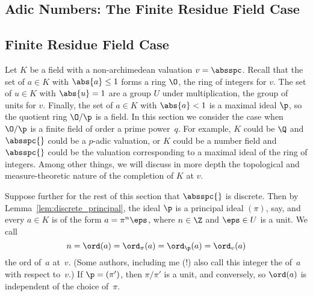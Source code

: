 \documentclass[11pt]{book}
\begin{document}
\begin{ch}
\chapter{Adic Numbers: The Finite Residue Field Case}

\section{Finite Residue Field Case}
Let $K$ be a field with a non-archimedean valuation $v=\absspc$.
Recall that the set of $a\in K$ with $\abs{a}\leq 1$ forms a ring
$\O$, the ring of integers for $v$.  The set of $u\in K$ with
$\abs{u}=1$ are a group $U$ under multiplication, the group of units
for $v$.  Finally, the set of $a\in K$ with $\abs{a}<1$ is a maximal
ideal $\p$, so the quotient ring $\O/\p$ is a field.  In this section
we consider the case when $\O/\p$ is a finite field of order a prime
power~$q$.  For example, $K$ could be $\Q$ and $\absspc{}$ could be a
$p$-adic valuation, or $K$ could be a number field and $\absspc{}$
could be the valuation corresponding to a maximal ideal of the ring of
integers.  Among other things, we will discuss in more depth the
topological and measure-theoretic nature of the completion of $K$ at
$v$.

Suppose further for the rest of this section that $\absspc{}$ is
discrete.  Then by Lemma~\ref{lem:discrete_principal}, the ideal $\p$
is a principal ideal $(\pi)$, say, and every $a\in K$ is of the form
$a=\pi^n\eps$, where $n\in\Z$ and $\eps\in U$ is a unit. We call
$$
n = \ord(a) = \ord_\pi(a) = \ord_\p(a) = \ord_v(a)
$$
the ord of~$a$ at~$v$.  (Some authors, including me (!) also call
this integer the  of~$a$ with respect to~$v$.)  If
$\p=(\pi')$, then $\pi/\pi'$ is a unit, and conversely, so $\ord(a)$
is independent of the choice of~$\pi$.


\end{ch}
\end{document}
